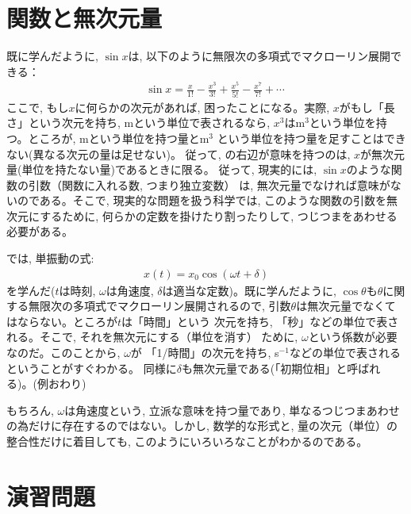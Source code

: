 \section{関数と無次元量}\label{sect:func_and_dimless}

既に学んだように, 
$\sin x$は, 以下のように無限次の多項式でマクローリン展開できる：
\begin{eqnarray}
&&\sin x = \frac{x}{1!}-\frac{x^3}{3!}+\frac{x^5}{5!}-\frac{x^7}{7!}+\cdots\label{eq:Taylor_sin8}
\end{eqnarray}
ここで, もし$x$に何らかの次元があれば, 困ったことになる。実際, 
$x$がもし「長さ」という次元を持ち, mという単位で表されるなら, 
$x^3$はm$^3$という単位を持つ。ところが, mという単位を持つ量とm$^3$
という単位を持つ量を足すことはできない(異なる次元の量は足せない)。
従って, の右辺が意味を持つのは, 
$x$が無次元量(単位を持たない量)であるときに限る。
従って, 現実的には, $\sin x$のような関数の引数（関数に入れる数, つまり独立変数）
は, 無次元量でなければ意味がないのである。そこで, 現実的な問題を扱う科学では, 
このような関数の引数を無次元にするために, 何らかの定数を掛けたり割ったりして, 
つじつまをあわせる必要がある。

\begin{exmpl}
では, 単振動の式:
\begin{eqnarray}
x(t)=x_0\cos(\omega t + \delta)\label{eq:trig_harmonic_oscilation_again}
\end{eqnarray}
を学んだ($t$は時刻, $\omega$は角速度, $\delta$は適当な定数)。既に学んだように, 
$\cos\theta$も$\theta$に関する無限次の多項式でマクローリン展開されるので, 
引数$\theta$は無次元量でなくてはならない。ところが$t$は「時間」という
次元を持ち, 「秒」などの単位で表される。そこで, それを無次元にする（単位を消す）
ために, $\omega$という係数が必要なのだ。このことから, $\omega$が
「1/時間」の次元を持ち, s$^{-1}$などの単位で表されるということがすぐわかる。
同様に$\delta$も無次元量である(「初期位相」と呼ばれる)。(例おわり)\end{exmpl}

もちろん, $\omega$は角速度という, 立派な意味を持つ量であり, 
単なるつじつまあわせの為だけに存在するのではない。しかし, 数学的な形式と, 
量の次元（単位）の整合性だけに着目しても, このようにいろいろなことがわかるのである。
\hv


\section*{演習問題}

